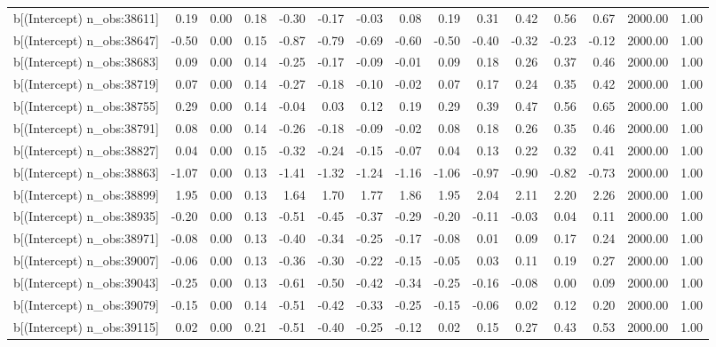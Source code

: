 \begin{table}[ht]
\begin{tabular}{rrrrrrrrrrrrrrr}
  b[(Intercept) n\_obs:38611] & 0.19 & 0.00 & 0.18 & -0.30 & -0.17 & -0.03 & 0.08 & 0.19 & 0.31 & 0.42 & 0.56 & 0.67 & 2000.00 & 1.00 \\ 
  b[(Intercept) n\_obs:38647] & -0.50 & 0.00 & 0.15 & -0.87 & -0.79 & -0.69 & -0.60 & -0.50 & -0.40 & -0.32 & -0.23 & -0.12 & 2000.00 & 1.00 \\ 
  b[(Intercept) n\_obs:38683] & 0.09 & 0.00 & 0.14 & -0.25 & -0.17 & -0.09 & -0.01 & 0.09 & 0.18 & 0.26 & 0.37 & 0.46 & 2000.00 & 1.00 \\ 
  b[(Intercept) n\_obs:38719] & 0.07 & 0.00 & 0.14 & -0.27 & -0.18 & -0.10 & -0.02 & 0.07 & 0.17 & 0.24 & 0.35 & 0.42 & 2000.00 & 1.00 \\ 
  b[(Intercept) n\_obs:38755] & 0.29 & 0.00 & 0.14 & -0.04 & 0.03 & 0.12 & 0.19 & 0.29 & 0.39 & 0.47 & 0.56 & 0.65 & 2000.00 & 1.00 \\ 
  b[(Intercept) n\_obs:38791] & 0.08 & 0.00 & 0.14 & -0.26 & -0.18 & -0.09 & -0.02 & 0.08 & 0.18 & 0.26 & 0.35 & 0.46 & 2000.00 & 1.00 \\ 
  b[(Intercept) n\_obs:38827] & 0.04 & 0.00 & 0.15 & -0.32 & -0.24 & -0.15 & -0.07 & 0.04 & 0.13 & 0.22 & 0.32 & 0.41 & 2000.00 & 1.00 \\ 
  b[(Intercept) n\_obs:38863] & -1.07 & 0.00 & 0.13 & -1.41 & -1.32 & -1.24 & -1.16 & -1.06 & -0.97 & -0.90 & -0.82 & -0.73 & 2000.00 & 1.00 \\ 
  b[(Intercept) n\_obs:38899] & 1.95 & 0.00 & 0.13 & 1.64 & 1.70 & 1.77 & 1.86 & 1.95 & 2.04 & 2.11 & 2.20 & 2.26 & 2000.00 & 1.00 \\ 
  b[(Intercept) n\_obs:38935] & -0.20 & 0.00 & 0.13 & -0.51 & -0.45 & -0.37 & -0.29 & -0.20 & -0.11 & -0.03 & 0.04 & 0.11 & 2000.00 & 1.00 \\ 
  b[(Intercept) n\_obs:38971] & -0.08 & 0.00 & 0.13 & -0.40 & -0.34 & -0.25 & -0.17 & -0.08 & 0.01 & 0.09 & 0.17 & 0.24 & 2000.00 & 1.00 \\ 
  b[(Intercept) n\_obs:39007] & -0.06 & 0.00 & 0.13 & -0.36 & -0.30 & -0.22 & -0.15 & -0.05 & 0.03 & 0.11 & 0.19 & 0.27 & 2000.00 & 1.00 \\ 
  b[(Intercept) n\_obs:39043] & -0.25 & 0.00 & 0.13 & -0.61 & -0.50 & -0.42 & -0.34 & -0.25 & -0.16 & -0.08 & 0.00 & 0.09 & 2000.00 & 1.00 \\ 
  b[(Intercept) n\_obs:39079] & -0.15 & 0.00 & 0.14 & -0.51 & -0.42 & -0.33 & -0.25 & -0.15 & -0.06 & 0.02 & 0.12 & 0.20 & 2000.00 & 1.00 \\ 
  b[(Intercept) n\_obs:39115] & 0.02 & 0.00 & 0.21 & -0.51 & -0.40 & -0.25 & -0.12 & 0.02 & 0.15 & 0.27 & 0.43 & 0.53 & 2000.00 & 1.00 \\ 

\end{tabular}
\end{table}
